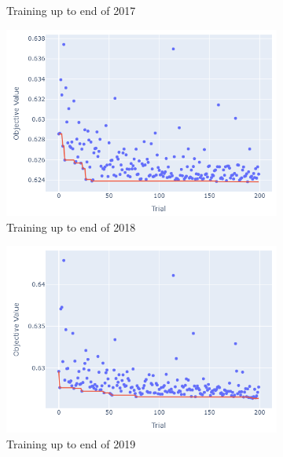 \documentclass[12pt,twoside]{report}
\begin{document}
\begin{figure}[htb]
\begin{subfigure}{.33\linewidth}
  \caption{Training up to end of 2017}
\end{subfigure}%
\begin{subfigure}{.33\linewidth}
  \centering
  \includegraphics[width=0.95\linewidth]{figures/va_lr_no_odds_cutoff_2018.png}
  \caption{Training up to end of 2018}
\end{subfigure}
\par\bigskip
\par\bigskip
\begin{subfigure}{.33\linewidth}
  \centering
  \includegraphics[width=0.95\linewidth]{figures/va_lr_no_odds_cutoff_2019.png}
  \caption{Training up to end of 2019}
\end{subfigure}%
\begin{subfigure}{.33\linewidth}
  \centering

\end{subfigure}
\end{figure}
\end{document}
